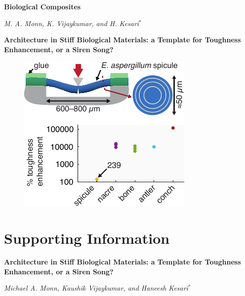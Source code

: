 \documentclass[12pt,onecolumn]{article}
\begin{document}
\vspace{2em}
\textbf{Biological Composites}

\vspace{2em}
\textit{M. A. Monn, K. Vijaykumar, and H. Kesari$^*$}

\textbf{Architecture in Stiff Biological Materials: a Template for Toughness Enhancement, or a Siren Song?}

\vspace{2em}
\begin{figure}[hb!]
    \centering
     \includegraphics[width=55 mm]{../Figures/FigureToC/FigureToC_V1.pdf}
\end{figure}

\makeatletter
\efloat@restorefloats
\makeatother

\doublespacing
\clearpage
\pagebreak
\onecolumn

\setcounter{page}{1}

\setcounter{section}{0}
\renewcommand{\thesection}{S\arabic{section}}

\setcounter{equation}{0}
\renewcommand{\theequation}{S\arabic{equation}}

\setcounter{figure}{0}
\renewcommand{\thefigure}{S\arabic{figure}}
\setcounter{table}{0}
\renewcommand{\thetable}{S\arabic{table}}

\part*{Supporting Information}

\textbf{Architecture in Stiff Biological Materials: a Template for Toughness Enhancement, or a Siren Song?}

\textit{Michael A. Monn, Kaushik Vijaykumar, and Haneesh Kesari$^*$}
\end{document}
